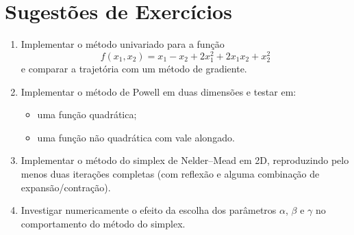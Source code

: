 \documentclass[9pt,a4paper]{extarticle}
\begin{document}
\section*{Sugestões de Exercícios}

\begin{enumerate}
    \item Implementar o método univariado para a função
    \[
        f(x_1,x_2) = x_1 - x_2 + 2x_1^2 + 2x_1x_2 + x_2^2
    \]
    e comparar a trajetória com um método de gradiente.
    \item Implementar o método de Powell em duas dimensões e testar em:
    \begin{itemize}
        \item uma função quadrática;
        \item uma função não quadrática com vale alongado.
    \end{itemize}
    \item Implementar o método do simplex de Nelder--Mead em 2D, reproduzindo pelo menos duas iterações completas (com reflexão e alguma combinação de expansão/contração).
    \item Investigar numericamente o efeito da escolha dos parâmetros $\alpha$, $\beta$ e $\gamma$ no comportamento do método do simplex.
\end{enumerate}
\end{document}
